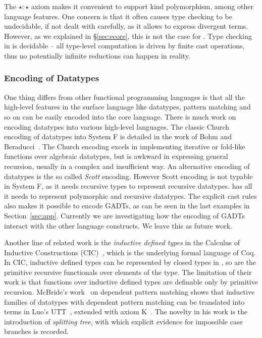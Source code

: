 The $\star : \star$ axiom makes it convenient to support kind
polymorphism, among other language features. One concern is that it
often causes type checking to be undecidable, if not dealt with
carefully, as it allows to express divergent terms. However, as we
explained in \S\ref{sec:ecore}, this is not the case for \name. Type
checking in \name is decidable -- all type-level computation is driven
by finite cast operations, thus no potentially infinite reductions can
happen in reality.

\subsubsection{Encoding of Datatypes}

One thing \name differs from other functional programming languages is
that all the high-level features in the surface language like
datatypes, pattern matching and so on can be easily encoded into the
core language. There is much work on encoding datatypes into various
high-level languages. The classic Church encoding of datatypes into
System F is detailed in the work of Bohm and
Beraducci~\cite{Bohm1985}. The Church encoding excels in implementing
iterative or fold-like functions over algebraic datatypes, but is
awkward in expressing general recursion, usually in a complex and
insufficient way. An alternative encoding of datatypes is the so
called \emph{Scott} encoding. However Scott encoding is not typable in
System F, as it needs recursive types to represent recursive
datatypes. \name has all it needs to represent polymorphic and
recursive datatypes. The explicit cast rules also makes it possible to
encode GADTs, as can be seen in the last examples in
Section~\ref{sec:app}. Currently we are investigating how the encoding
of GADTs interact with the other language constructs. We leave this as
future work.

Another line of related work is the \emph{inductive defined types} in
the Calculus of Inductive Constructions (CIC)~\cite{cic}, which is the
underlying formal language of Coq. In CIC, inductive defined types can
be represented by closed types in \coc, so are the primitive recursive
functionals over elements of the type. The limitation of their work is
that functions over inductive defined types are definable only by
primitive recursion. McBride's work~\cite{elim:pi:pattern} on
dependent pattern matching shows that inductive families of datatypes
with dependent pattern matching can be translated into terms in Luo's
UTT~\cite{Luo:UTT}, extended with axiom K~\cite{axiomK}. The novelty
in his work is the introduction of \emph{splitting tree}, with which
explicit evidence for impossible case branches is recorded.

